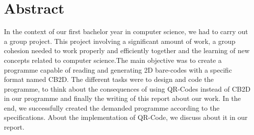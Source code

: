 \newpage

\section*{Abstract} 

In the context of our first bachelor year in computer science, we had to carry out a group project. This project involving a significant amount of work, a group cohesion needed to work properly and efficiently together and the learning of new concepts related to computer science.The main objective was to create a programme capable of reading and generating 2D bare-codes with a specific format named CB2D. The different tasks were to design and code the programme, to think about the consequences of using QR-Codes instead of CB2D in our programme and finally the writing of this report about our work. In the end, we successfully created the demanded programme according to the specifications. About the implementation of QR-Code, we discuss about it in our report.

